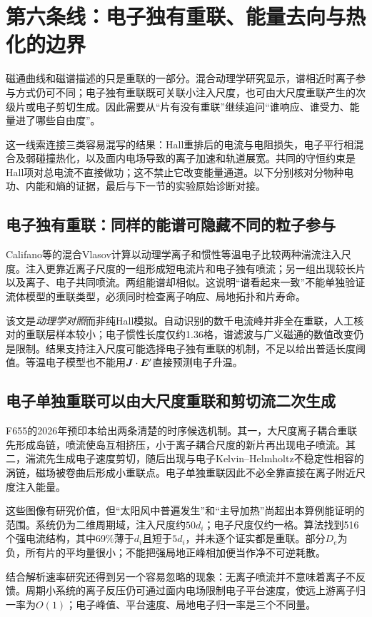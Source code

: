 \section{第六条线：电子独有重联、能量去向与热化的边界}\label{story:energy}
磁通曲线和磁谱描述的只是重联的一部分。混合动理学研究显示，谱相近时离子参与方式仍可不同；电子独有重联既可关联小注入尺度，也可由大尺度重联产生的次级片或电子剪切生成。因此需要从“片有没有重联”继续追问“谁响应、谁受力、能量进了哪些自由度”。

这一线索连接三类容易混写的结果：Hall重排后的电流与电阻损失，电子平行相混合及弱碰撞热化，以及面内电场导致的离子加速和轨道展宽。共同的守恒约束是Hall项对总电流不直接做功；这不禁止它改变能量通道。以下分别核对分物种电功、内能和熵的证据，最后与下一节的实验原始诊断对接。

\subsection{电子独有重联：同样的能谱可隐藏不同的粒子参与}
Califano等的混合Vlasov计算以动理学离子和惯性等温电子比较两种湍流注入尺度。注入更靠近离子尺度的一组形成短电流片和电子独有喷流；另一组出现较长片以及离子、电子共同喷流。两组能谱却相似。这说明“谱看起来一致”不能单独验证流体模型的重联类型，必须同时检查离子响应、局地拓扑和片寿命。\citep{L267}

该文是\emph{动理学对照}而非纯Hall模拟。自动识别的数千电流峰并非全在重联，人工核对的重联层样本较小；电子惯性长度仅约1.36格，谱滤波与广义磁通的数值改变仍是限制。结果支持注入尺度可能选择电子独有重联的机制，不足以给出普适长度阈值。等温电子模型也不能用$\bm{J}\cdot\bm{E}'$直接预测电子升温。

\subsection{电子单独重联可以由大尺度重联和剪切流二次生成}
F655的2026年预印本\citep{F655}给出两条清楚的时序候选机制。其一，大尺度离子耦合重联先形成岛链，喷流使岛互相挤压，小于离子耦合尺度的新片再出现电子喷流。其二，湍流先生成电子速度剪切，随后出现与电子Kelvin--Helmholtz不稳定性相容的涡链，磁场被卷曲后形成小重联点。电子单独重联因此不必全靠直接在离子附近尺度注入能量。

这些图像有研究价值，但“太阳风中普遍发生”和“主导加热”尚超出本算例能证明的范围。系统仍为二维周期域，注入尺度约$50d_i$；电子尺度仅约一格。算法找到516个强电流结构，其中69\%薄于$d_i$且短于$5d_i$，并未逐个证实都是重联。部分$D_e$为负，所有片的平均量很小；不能把强局地正峰相加便当作净不可逆耗散。

结合解析速率研究\citep{F741}还得到另一个容易忽略的现象：无离子喷流并不意味着离子不反馈。周期小系统的离子反压仍可通过面内电场限制电子平台速度，使远上游离子归一率为$O(1)$；电子峰值、平台速度、局地电子归一率是三个不同量。

